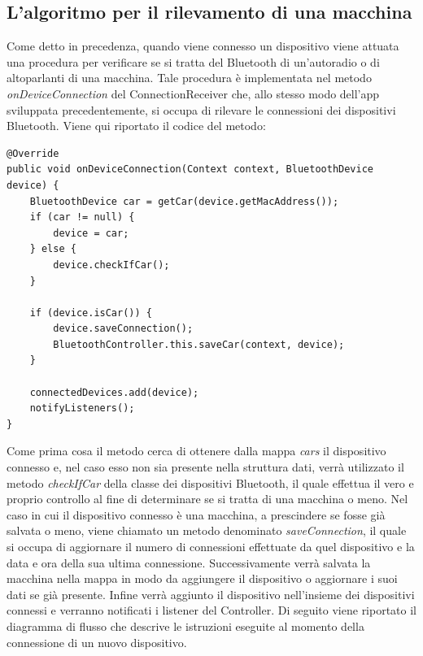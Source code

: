 \subsection{L'algoritmo per il rilevamento di una macchina}\label{ref:rilevamento_macchina}
Come detto in precedenza, quando viene connesso un dispositivo viene attuata una procedura per verificare se si tratta del Bluetooth di un'autoradio o di altoparlanti di una macchina. Tale procedura è implementata nel metodo \textit{onDeviceConnection} del ConnectionReceiver che, allo stesso modo dell'app sviluppata precedentemente, si occupa di rilevare le connessioni dei dispositivi Bluetooth. Viene qui riportato il codice del metodo:
\begin{verbatim}
@Override
public void onDeviceConnection(Context context, BluetoothDevice device) {
    BluetoothDevice car = getCar(device.getMacAddress());
    if (car != null) {
        device = car;
    } else {
        device.checkIfCar();
    }

    if (device.isCar()) {
        device.saveConnection();
        BluetoothController.this.saveCar(context, device);
    }

    connectedDevices.add(device);
    notifyListeners();
}
\end{verbatim}
Come prima cosa il metodo cerca di ottenere dalla mappa \textit{cars} il dispositivo connesso e, nel caso esso non sia presente nella struttura dati, verrà utilizzato il metodo \textit{checkIfCar} della classe dei dispositivi Bluetooth, il quale effettua il vero e proprio controllo al fine di determinare se si tratta di una macchina o meno. Nel caso in cui il dispositivo connesso è una macchina, a prescindere se fosse già salvata o meno, viene chiamato un metodo denominato \textit{saveConnection}, il quale si occupa di aggiornare il numero di connessioni effettuate da quel dispositivo e la data e ora della sua ultima connessione. Successivamente verrà salvata la macchina nella mappa in modo da aggiungere il dispositivo o aggiornare i suoi dati se già presente. Infine verrà aggiunto il dispositivo nell'insieme dei dispositivi connessi e verranno notificati i listener del Controller. Di seguito viene riportato il diagramma di flusso che descrive le istruzioni eseguite al momento della connessione di un nuovo dispositivo.

